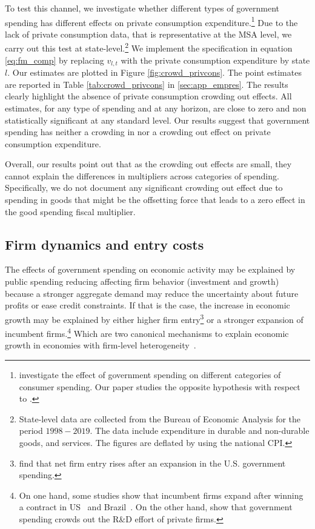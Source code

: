 \documentclass[dv_diss_main.tex]{subfiles}
\begin{document}
To test this channel, we investigate whether different types of government spending has different effects on private consumption expenditure.\footnote{\cite{Dupor2021} investigate the effect of government spending on different categories of consumer spending. Our paper studies the opposite hypothesis with respect to \cite{Dupor2021}.} Due to the lack of private consumption data, that is representative at the MSA level, we carry out this test at state-level.\footnote{State-level data are collected from the Bureau of Economic Analysis for the period $1998-2019$. The data include expenditure in durable and non-durable goods, and services. The figures are deflated by using the national CPI.} We implement the specification in equation \eqref{eq:fm_comp} by replacing $v_{l,t}$ with the private consumption expenditure by state $l$. Our estimates are plotted in Figure \ref{fig:crowd_privcons}. The point estimates are reported in Table \ref{tab:crowd_privcons} in \ref{sec:app_empres}. The results clearly highlight the absence of private consumption crowding out effects. All estimates, for any type of spending and at any horizon, are close to zero and non statistically significant at any standard level. Our results suggest that government spending has neither a crowding in nor a crowding out effect on private consumption expenditure.

Overall, our results point out that as the crowding out effects are small, they cannot explain the differences in multipliers across categories of spending. Specifically, we do not document any significant crowding out effect due to spending in goods that might be the offsetting force that leads to a zero effect in the good spending fiscal multiplier. 

\subsection{Firm dynamics and entry costs}\label{subsec:bus_dyn}

The effects of government spending on economic activity may be explained by public spending reducing affecting firm behavior (investment and growth) because a stronger aggregate demand may reduce the uncertainty about future profits or ease credit constraints. If that is the case, the increase in economic growth may be explained by either higher firm entry\footnote{\cite{Lewis2017} find that net firm entry rises after an expansion in the U.S. government spending.} or a stronger expansion of incumbent firms.\footnote{On one hand, some studies show that incumbent firms expand after winning a contract in US~\citep{Juarros2021} and Brazil~\citep{Ferraz2015, Lee2021}. On the other hand, \cite{Atanassov2018} show that government spending crowds out the R\&D effort of private firms.} Which are two canonical mechanisms to explain economic growth in economies with firm-level heterogeneity~\citep{Acemoglu2018}.
\end{document}

